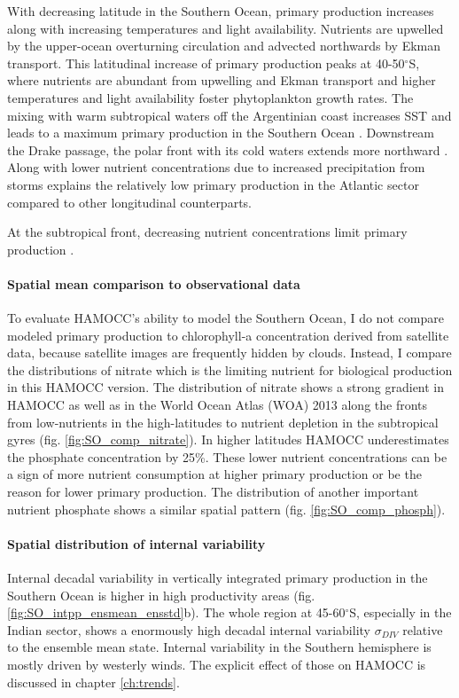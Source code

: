 \documentclass[12pt]{article}
\begin{document}
With decreasing latitude in the Southern Ocean, primary production increases along with increasing temperatures and light availability. Nutrients are upwelled by the upper-ocean overturning circulation and advected northwards by Ekman transport. This latitudinal increase of primary production peaks at 40-50$^\circ$S, where nutrients are abundant from upwelling and Ekman transport and higher temperatures and light availability foster phytoplankton growth rates. The mixing with warm subtropical waters off the Argentinian coast increases SST and leads to a maximum primary production in the Southern Ocean \citep{Behrenfeld2014}. Downstream the Drake passage, the polar front with its cold waters extends more northward \citep{Orsi1995}. Along with lower nutrient concentrations due to increased precipitation from storms explains the relatively low primary production in the Atlantic sector compared to other longitudinal counterparts. 

At the subtropical front, decreasing nutrient concentrations limit primary production \citep{Behrenfeld2014}. 


\paragraph{Spatial mean comparison to observational data}
To evaluate HAMOCC's ability to model the Southern Ocean, I do not compare modeled primary production to chlorophyll-a  concentration derived from satellite data, because satellite images are frequently  hidden by clouds. Instead, I compare the distributions of nitrate which is the limiting nutrient for biological production in this HAMOCC version. %
The distribution of nitrate shows a strong gradient in HAMOCC as well as in the  World Ocean Atlas (WOA) 2013  \citep{WOA2013} along the fronts from low-nutrients in the high-latitudes to nutrient depletion in the subtropical gyres (fig. \ref{fig:SO_comp_nitrate}). In higher latitudes HAMOCC underestimates the phosphate concentration by 25\%. These lower nutrient concentrations can be a sign of more nutrient consumption at higher primary production or be the reason for lower primary production. The distribution of another important nutrient phosphate shows a similar spatial pattern (fig. \ref{fig:SO_comp_phosph}).

\paragraph{Spatial distribution of internal variability} 
Internal decadal variability in vertically integrated primary production in the Southern Ocean is higher in high productivity areas (fig. \ref{fig:SO_intpp_ensmean_ensstd}b). The whole region at 45-60$^\circ$S, especially in the Indian sector, shows a enormously high decadal internal variability $\sigma_{DIV}$ relative to the ensemble mean state. Internal variability in the Southern hemisphere is mostly driven by westerly winds. The explicit effect of those on HAMOCC is discussed in chapter \ref{ch:trends}. 
\end{document}
